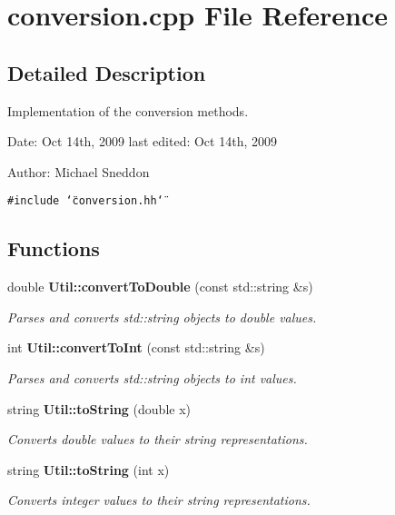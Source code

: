 \section{conversion.cpp File Reference}
\label{conversion_8cpp}


\subsection{Detailed Description}
Implementation of the conversion methods.

\begin{Desc}
\item[Date:]Oct 14th, 2009 last edited: Oct 14th, 2009\end{Desc}
\begin{Desc}
\item[Author:]Michael Sneddon \end{Desc}


{\tt \#include \char`\"{}conversion.hh\char`\"{}}\par
\subsection*{Functions}
\begin{CompactItemize}
\item 
double {\bf Util::convertToDouble} (const std::string \&s)
\begin{CompactList}\small\item\em Parses and converts std::string objects to double values. \item\end{CompactList}\item 
int {\bf Util::convertToInt} (const std::string \&s)
\begin{CompactList}\small\item\em Parses and converts std::string objects to int values. \item\end{CompactList}\item 
string {\bf Util::toString} (double x)
\begin{CompactList}\small\item\em Converts double values to their string representations. \item\end{CompactList}\item 
string {\bf Util::toString} (int x)
\begin{CompactList}\small\item\em Converts integer values to their string representations. \item\end{CompactList}\end{CompactItemize}
